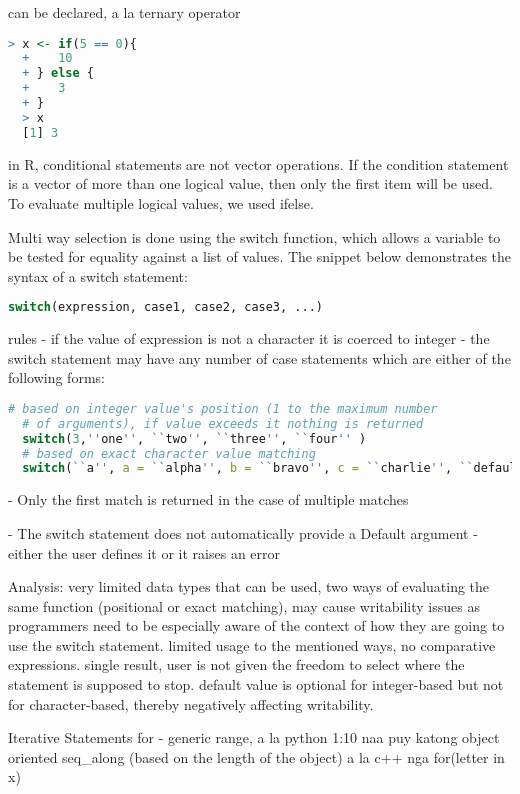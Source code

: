 \documentclass[12pt]{article}
\begin{document}
can be declared, a la ternary operator

\begin{lstlisting}[language=R]
  > x <- if(5 == 0){
  +    10
  + } else {
  +    3
  + }
  > x
  [1] 3
\end{lstlisting}

in R, conditional statements are not vector operations. If the condition statement is a vector of more than one logical value, then only the first item will be used. To evaluate multiple logical values, we used ifelse.

Multi way selection is done using the switch function, which allows a variable to be tested for equality against a list of values. The snippet below demonstrates the syntax of a switch statement:

\begin{lstlisting}[language=R]
  switch(expression, case1, case2, case3, ...)
\end{lstlisting}

rules
- if the value of expression is not a character it is coerced to integer
- the switch statement may have any number of case statements which are either of the following forms:

\begin{lstlisting}[language=R]
  # based on integer value's position (1 to the maximum number
  # of arguments), if value exceeds it nothing is returned
  switch(3,''one'', ``two'', ``three'', ``four'' )
  # based on exact character value matching
  switch(``a'', a = ``alpha'', b = ``bravo'', c = ``charlie'', ``default value'')
\end{lstlisting}

- Only the first match is returned in the case of multiple matches

- The switch statement does not automatically provide a Default argument - either the user defines it or it raises an error

Analysis: very limited data types that can be used, two ways of evaluating the same function (positional or exact matching), may cause writability issues as programmers need to be especially aware of the context of how they are going to use the switch statement. limited usage to the mentioned ways, no comparative expressions. single result, user is not given the freedom to select where the statement is supposed to stop. default value is optional for integer-based but not for character-based, thereby negatively affecting writability.


Iterative Statements
for - generic
range, a la python 1:10
naa puy katong object oriented seq\_along (based on the length of the object)
a la c++ nga for(letter in x)
\end{document}
